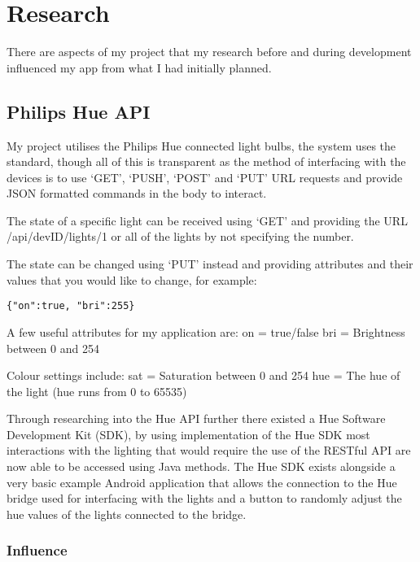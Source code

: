 \section{Research}\label{research}

There are aspects of my project that my research before and during
development influenced my app from what I had initially planned.

\subsection{Philips Hue API}\label{philips-hue-api}

My project utilises the Philips Hue connected light bulbs, the
\cite{philipshue} system uses the \cite{zigbee} standard, though all of
this is transparent as the method of interfacing with the devices is to
use `GET', `PUSH', `POST' and `PUT' URL requests and provide JSON
formatted commands in the body to interact.

The state of a specific light can be received using `GET' and providing
the URL /api/devID/lights/1 or all of the lights by not specifying the
number.

The state can be changed using `PUT' instead and providing attributes
and their values that you would like to change, for example:

\begin{lstlisting}
{"on":true, "bri":255}
\end{lstlisting}

A few useful attributes for my application are: on = true/false bri =
Brightness between 0 and 254

Colour settings include: sat = Saturation between 0 and 254 hue = The
hue of the light (hue runs from 0 to 65535)

Through researching into the Hue API further there existed a Hue
Software Development Kit (SDK), by using implementation of the Hue SDK
most interactions with the lighting that would require the use of the
RESTful API are now able to be accessed using Java methods. The Hue SDK
exists alongside a very basic example Android application that allows
the connection to the Hue bridge used for interfacing with the lights
and a button to randomly adjust the hue values of the lights connected
to the bridge.

\subsubsection{Influence}\label{influence}

